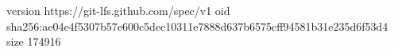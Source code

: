 version https://git-lfs.github.com/spec/v1
oid sha256:ae04e4f5307b57e600c5dec10311e7888d637b6575cff94581b31e235d6f53d4
size 174916
